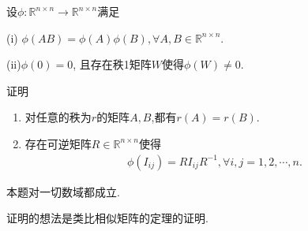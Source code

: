 \documentclass[../../main.tex]{subfiles}%
\begin{document}
\begin{theorem}
设$\phi: \mathbb{R}^{n \times n} \to \mathbb{R}^{n \times n}$满足

(i) $\phi(AB) = \phi(A)\phi(B), \forall A,B \in \mathbb{R}^{n \times n}$.

(ii)$\phi(0) = 0$, 且存在秩1矩阵$W$使得$\phi(W) \neq 0$.

证明
\begin{enumerate}[(1)]
\item 对任意的秩为$r$的矩阵$A,B$,都有$r(A)=r(B).$

\item 存在可逆矩阵$R \in \mathbb{R}^{n \times n}$使得
\begin{align}
\phi(I_{ij}) = R I_{ij} R^{-1}, \forall i,j = 1,2,\cdots,n. \label{eq:23.81}
\end{align}
\end{enumerate}
\end{theorem}
\begin{note}
本题对一切数域都成立.

证明的想法是类比相似矩阵的定理的证明. 
\end{note}
\end{document}

